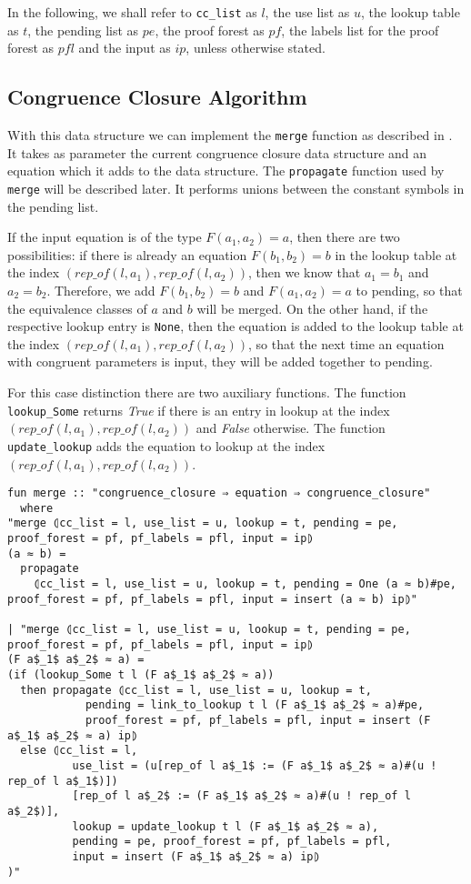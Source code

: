 In the following, we shall refer to \lstinline{cc_list} as $l$, the use list as $u$, the lookup table as $t$, the pending list as $pe$, the proof forest as $pf$, the labels list for the proof forest as $pfl$ and the input as $ip$, unless otherwise stated.

\subsection{Congruence Closure Algorithm}

With this data structure we can implement the \lstinline{merge} function as described in \cite{Nieuwenhuis}.
It takes as parameter the current congruence closure data structure and an equation which it adds to the data structure. The \lstinline{propagate} function used by \lstinline{merge} will be described later. It performs unions between the constant symbols in the pending list.

If the input equation is of the type $F(a_1, a_2) = a$, then there are two possibilities: if there is already an equation $F(b_1, b_2) = b$ in the lookup table at the index $(rep\_of(l,a_1), rep\_of(l,a_2))$, then we know that $a_1 = b_1$ and $a_2 = b_2$. Therefore, we add $F(b_1, b_2) = b$ and $F(a_1, a_2) = a$ to pending, so that the equivalence classes of $a$ and $b$ will be merged.
On the other hand, if the respective lookup entry is \lstinline{None}, then the equation is added to the lookup table at the index $(rep\_of(l,a_1), rep\_of(l,a_2))$, so that the next time an equation with congruent parameters is input, they will be added together to pending.

For this case distinction there are two auxiliary functions.
The function \lstinline{lookup_Some} returns \emph{True} if there is an entry in lookup at the index $(rep\_of(l,a_1), rep\_of(l,a_2))$ and \emph{False} otherwise. The function \lstinline{update_lookup} adds the equation to lookup at the index $(rep\_of(l,a_1), rep\_of(l,a_2))$.

\begin{lstlisting}
fun merge :: "congruence_closure ⇒ equation ⇒ congruence_closure"
  where
"merge ⦇cc_list = l, use_list = u, lookup = t, pending = pe, proof_forest = pf, pf_labels = pfl, input = ip⦈
(a ≈ b) =
  propagate
    ⦇cc_list = l, use_list = u, lookup = t, pending = One (a ≈ b)#pe, proof_forest = pf, pf_labels = pfl, input = insert (a ≈ b) ip⦈"

| "merge ⦇cc_list = l, use_list = u, lookup = t, pending = pe, proof_forest = pf, pf_labels = pfl, input = ip⦈
(F a$_1$ a$_2$ ≈ a) =
(if (lookup_Some t l (F a$_1$ a$_2$ ≈ a))
  then propagate ⦇cc_list = l, use_list = u, lookup = t,
            pending = link_to_lookup t l (F a$_1$ a$_2$ ≈ a)#pe,
            proof_forest = pf, pf_labels = pfl, input = insert (F a$_1$ a$_2$ ≈ a) ip⦈
  else ⦇cc_list = l,
          use_list = (u[rep_of l a$_1$ := (F a$_1$ a$_2$ ≈ a)#(u ! rep_of l a$_1$)])
          [rep_of l a$_2$ := (F a$_1$ a$_2$ ≈ a)#(u ! rep_of l a$_2$)],
          lookup = update_lookup t l (F a$_1$ a$_2$ ≈ a),
          pending = pe, proof_forest = pf, pf_labels = pfl,
          input = insert (F a$_1$ a$_2$ ≈ a) ip⦈
)"
\end{lstlisting}


